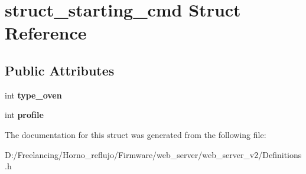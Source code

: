 \hypertarget{structstruct__starting__cmd}{}\section{struct\+\_\+starting\+\_\+cmd Struct Reference}
\label{structstruct__starting__cmd}
\subsection*{Public Attributes}
\begin{DoxyCompactItemize}
\item 
\mbox{\label{structstruct__starting__cmd_a7cf9d847254275c9ac7aa70bf9c449f8}} 
int {\bfseries type\+\_\+oven}
\item 
\mbox{\label{structstruct__starting__cmd_ae25f9649b611086073b11a0f0d20f6ea}} 
int {\bfseries profile}
\end{DoxyCompactItemize}


The documentation for this struct was generated from the following file\+:\begin{DoxyCompactItemize}
\item 
D\+:/\+Freelancing/\+Horno\+\_\+reflujo/\+Firmware/web\+\_\+server/web\+\_\+server\+\_\+v2/Definitions.\+h\end{DoxyCompactItemize}
